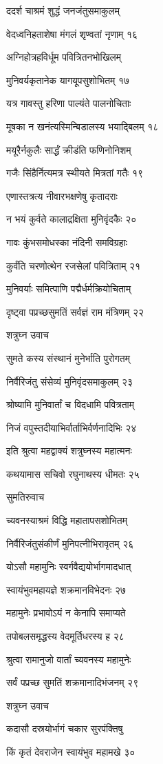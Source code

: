 ददर्श चाश्रमं शुद्धं जनजंतुसमाकुलम्

वेदध्वनिहताशेषा मंगलं शृण्वतां नृणाम् १६

अग्निहोत्रहविर्धूम पवित्रितनभोखिलम्

मुनिवर्यकृतानेक यागयूपसुशोभितम् १७

यत्र गावस्तु हरिणा पाल्यंते पालनोचिताः

मूषका न खनंत्यस्मिन्बिडालस्य भयाद्बिलम् १८

मयूरैर्नकुलैः सार्द्धं क्रीडंति फणिनोनिशम्

गजैः सिंहैर्नित्यमत्र स्थीयते मित्रतां गतैः १९

एणास्तत्रत्य नीवारभक्षणेषु कृतादराः

न भयं कुर्वते कालाद्रक्षिता मुनिवृंदकैः २०

गावः कुंभसमोधस्का नंदिनी समविग्रहाः

कुर्वंति चरणोत्थेन रजसेलां पवित्रिताम् २१

मुनिवर्याः समित्पाणि पद्मैर्धर्मक्रियोचिताम्

दृष्ट्वा पप्रच्छसुमतिं सर्वज्ञं राम मंत्रिणम् २२

शत्रुघ्न उवाच

सुमते कस्य संस्थानं मुनेर्भाति पुरोगतम्

निर्वैरिजंतु संसेव्यं मुनिवृंदसमाकुलम् २३

श्रोष्यामि मुनिवार्तां च विदधामि पवित्रताम्

निजं वपुस्तदीयाभिर्वार्ताभिर्वर्णनादिभिः २४

इति श्रुत्वा महद्वाक्यं शत्रुघ्नस्य महात्मनः

कथयामास सचिवो रघुनाथस्य धीमतः २५

सुमतिरुवाच

च्यवनस्याश्रमं विद्धि महातापसशोभितम्

निर्वैरिजंतुसंकीर्णं मुनिपत्नीभिरावृतम् २६

योऽसौ महामुनिः स्वर्गवैद्ययोर्भागमादधात्

स्वायंभुवमहायज्ञे शक्रमानविभेदनः २७

महामुनेः प्रभावोऽयं न केनापि समाप्यते

तपोबलसमृद्धस्य वेदमूर्तिधरस्य ह २८

श्रुत्वा रामानुजो वार्तां च्यवनस्य महामुनेः

सर्वं पप्रच्छ सुमतिं शक्रमानादिभंजनम् २९

शत्रुघ्न उवाच

कदासौ दस्रयोर्भागं चकार सुरपंक्तिषु

किं कृतं देवराजेन स्वायंभुव महामखे ३०


